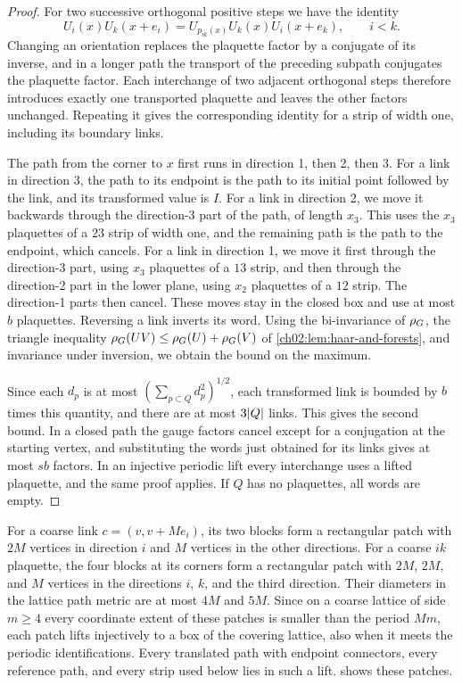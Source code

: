 \begin{proof}
For two successive orthogonal positive steps we have the identity
\[
 U_i(x)U_k(x+e_i)=U_{p_{ik}(x)}U_k(x)U_i(x+e_k),\qquad i<k.
\]
Changing an orientation replaces the plaquette factor by a conjugate of its inverse, and in a longer path the transport of the preceding subpath conjugates the plaquette factor. Each interchange of two adjacent orthogonal steps therefore introduces exactly one transported plaquette and leaves the other factors unchanged. Repeating it gives the corresponding identity for a strip of width one, including its boundary links.

The path from the corner to $x$ first runs in direction 1, then 2, then 3. For a link in direction 3, the path to its endpoint is the path to its initial point followed by the link, and its transformed value is $I$. For a link in direction 2, we move it backwards through the direction-3 part of the path, of length $x_3$. This uses the $x_3$ plaquettes of a $23$ strip of width one, and the remaining path is the path to the endpoint, which cancels. For a link in direction 1, we move it first through the direction-3 part, using $x_3$ plaquettes of a $13$ strip, and then through the direction-2 part in the lower plane, using $x_2$ plaquettes of a $12$ strip. The direction-1 parts then cancel. These moves stay in the closed box and use at most $b$ plaquettes. Reversing a link inverts its word. Using the bi-invariance of $\rho_G$, the triangle inequality $\rho_G(UV)\le\rho_G(U)+\rho_G(V)$ of \cref{ch02:lem:haar-and-forests}, and invariance under inversion, we obtain the bound on the maximum.

Since each $d_p$ is at most $(\sum_{p\subset Q}d_p^2)^{1/2}$, each transformed link is bounded by $b$ times this quantity, and there are at most $3\lvert Q\rvert$ links. This gives the second bound. In a closed path the gauge factors cancel except for a conjugation at the starting vertex, and substituting the words just obtained for its links gives at most $sb$ factors. In an injective periodic lift every interchange uses a lifted plaquette, and the same proof applies. If $Q$ has no plaquettes, all words are empty.
\end{proof}

For a coarse link $c=(v,v+Me_i)$, its two blocks form a rectangular patch with $2M$ vertices in direction $i$ and $M$ vertices in the other directions. For a coarse $ik$ plaquette, the four blocks at its corners form a rectangular patch with $2M$, $2M$, and $M$ vertices in the directions $i$, $k$, and the third direction. Their diameters in the lattice path metric are at most $4M$ and $5M$. Since on a coarse lattice of side $m\ge4$ every coordinate extent of these patches is smaller than the period $Mm$, each patch lifts injectively to a box of the covering lattice, also when it meets the periodic identifications. Every translated path with endpoint connectors, every reference path, and every strip used below lies in such a lift.  shows these patches.

